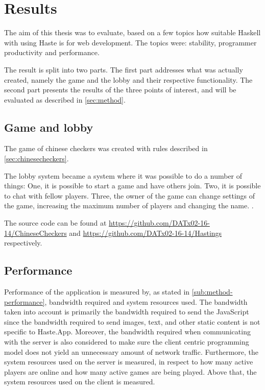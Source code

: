 \documentclass[a4paper]{article}
\begin{document}
\section{Results}
The aim of this thesis was to evaluate, based on a few topics how suitable Haskell with using Haste is for web development.
The topics were: stability, programmer productivity and performance.

The result is split into two parts. The first part addresses what was actually created, namely the game and the lobby and their respective functionality. The second part presents the results of the three points of interest, and will be evaluated as described in \cref{sec:method}.

\subsection{Game and lobby}
The game of chinese checkers was created with rules described in \cref{sec:chinesecheckers}.

The lobby system became a system where it was possible to do a number of things: One, it is possible to start a game and have others join. Two, it is possible to chat with fellow players. Three, the owner of the game can change settings of the game, increasing the maximum number of players and changing the name. .

The source code can be found at \url{https://github.com/DATx02-16-14/ChineseCheckers} and \url{https://github.com/DATx02-16-14/Hastings} respectively. 

\subsection{Performance}

Performance of the application is measured by, as stated in \cref{sub:method-performance}, bandwidth required and system resources used. The bandwidth taken into account is primarily the bandwidth required to send the JavaScript since the bandwidth required to send images, text, and other static content is not specific to Haste.App. Moreover, the bandwidth required when communicating with the server is also considered to make sure the client centric programming model does not yield an unnecessary amount of network traffic. Furthermore, the system resources used on the server is measured, in respect to how many active players are online and how many active games are being played. Above that, the system resources used on the client is measured.
\end{document}

